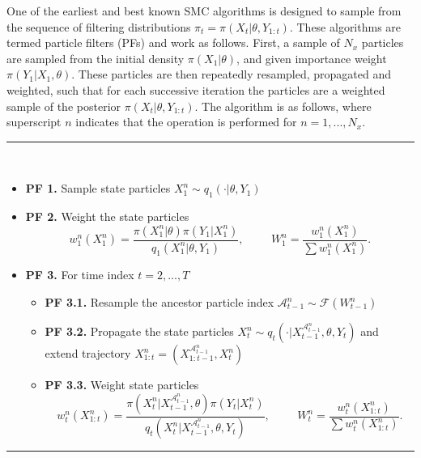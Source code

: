 \documentclass[a4paper,12pt]{article}
\begin{document}
One of the earliest and best known SMC algorithms \cite{Gordon1993} is designed  to sample from the sequence of filtering distributions $\pi_t = \pi(X_t \vert \theta, Y_{1:t})$. These algorithms are termed particle filters (PFs) and work as follows.
First, a sample of $N_x$ particles are sampled from the initial density $\pi (X_1 \vert \theta)$, and given importance weight $\pi (Y_1 \vert X_1, \theta)$.
These particles are then repeatedly resampled, propagated and weighted, such that for each successive iteration the particles are a weighted sample of the posterior $\pi(X_t \vert \theta, Y_{1:t})$.
The algorithm is as follows, where superscript $n$ indicates that the operation is performed for  $n = 1,...,N_x$.

\noindent \rule{\textwidth}{1pt}\\

\begin{itemize}
\item {\bf PF 1.} Sample state particles $X_1^n \sim q_1(\cdot \vert \theta, Y_1)$
\item {\bf PF 2.} Weight the state particles
\[ w_1^n (X_1^n) = \frac{\pi(X_1^n \vert \theta) \pi(Y_1 \vert X_1^n)}{q_1(X_1^n \vert \theta, Y_1)}, \hspace{1cm} W_1^{n} = \frac{w_1^n (X_1^n)}{\sum w_1^n (X_1^n)}.\]
\item {\bf PF 3.} For time index $t=2,...,T$
\begin{itemize}
\item {\bf PF 3.1.} Resample the ancestor particle index $\mathcal{A}_{t-1}^n \sim \mathcal{F}(W_{t-1}^n)$
\item {\bf PF 3.2.} Propagate the state particles $X_t^n \sim q_t(\cdot \vert X_{t-1}^{\mathcal{A}_{t-1}^n}, \theta, Y_t)$ and extend trajectory $X_{1:t}^n = \left(X_{1:t-1}^{\mathcal{A}_{t-1}^n}, X_t^n \right)$
\item {\bf PF 3.3.} Weight state particles
\[ w_t^n(X_{1:t}^n) = \frac{\pi(X_t^n \vert X_{t-1}^{\mathcal{A}_{t-1}^n}, \theta) \pi(Y_t \vert X_t^n)}{q_t(X_t^n \vert X_{t-1}^{\mathcal{A}_{t-1}^n}, \theta, Y_t)} , \hspace{1cm} W_t^n = \frac{w_t^n (X_{1:t}^n)}{\sum w_t^n (X_{1:t}^n)}. \]
\end{itemize}
\end{itemize}

\noindent \rule{\textwidth}{1pt}

\vspace{10pt}
\end{document}
